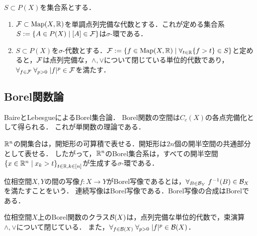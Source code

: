 \documentclass[uplatex,dvipdfmx]{jsreport}
\begin{document}
\begin{lemma}\label{lemma-function-space-defined-by-measurable-sets}
    $S\subset P(X)$を集合系とする．
    \begin{enumerate}
        \item $\mathcal{F}\subset\mathrm{Map}(X,\mathbb{R})$を単調点列完備な代数とする．これが定める集合系$S:=\left\{A\in P(X)\mid [A]\in\mathcal{F}\right\}$は$\sigma$-環である．
        \item $S\subset P(X)$を$\sigma$-代数とする．$\mathcal{F}:=\left\{f\in\mathrm{Map}(X,\mathbb{R})\mid\forall_{t\in\mathbb{R}}\{f>t\}\in S\right\}$と定めると，$\mathcal{F}$は点列完備な，$\land,\lor$について閉じている単位的代数であり，$\forall_{f\in\mathcal{F}}\;\forall_{p>0}\;\lvert f\rvert^p\in\mathcal{F}$を満たす．
    \end{enumerate}
\end{lemma}

\subsection{Borel関数論}

\begin{tcolorbox}[colframe=ForestGreen, colback=ForestGreen!10!white,breakable,colbacktitle=ForestGreen!40!white,coltitle=black,fonttitle=\bfseries\sffamily,
title=単関数各点近似が出来るクラスが可測関数である]
    BaireとLebesgueによるBorel集合論．
    Borel関数の空間は$C_c(X)$の各点完備化として得られる．
    これが単関数の理論である．
\end{tcolorbox}

\begin{example}[Euclid空間のBorel集合]
    $\mathbb{R}^n$の開集合は，開矩形の可算積で表せる．開矩形は$2n$個の開半空間の共通部分として表せる．
    したがって，$\mathbb{R}^n$のBorel集合系は，すべての開半空間$\left\{x\in\mathbb{R}^n\mid x_k>t\right\}_{t\in\mathbb{R},k\in[n]}$が生成する$\sigma$-環である．
\end{example}

\begin{definition}
    位相空間$X,Y$の間の写像$f:X\to Y$がBorel写像であるとは，$\forall_{B\in\mathcal{B}_Y}\;f^{-1}(B)\in\mathcal{B}_X$を満たすことをいう．
    連続写像はBorel写像である．Borel写像の合成はBorelである．
\end{definition}

\begin{corollary}
    位相空間$X$上のBorel関数のクラス$\mathcal{B}(X)$は，点列完備な単位的代数で，束演算$\land,\lor$について閉じている．
    また，$\forall_{f\in\mathcal{B}(X)}\;\forall_{p>0}\;\lvert f\rvert^p\in\mathcal{B}(X)$．
\end{corollary}
\end{document}
